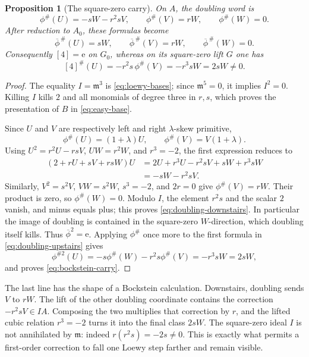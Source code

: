 \documentclass[11pt]{amsart}
\newtheorem{proposition}[theorem]{Proposition}
\theoremstyle{definition}
\theoremstyle{remark}
\newcommand{\m}{\mathfrak m}
\newcommand{\unit}{\mathrm e}
\begin{document}
\begin{proposition}[The square-zero carry]\label{prop:square-zero-carry}
On \(A\), the doubling word is
\begin{equation}\label{eq:doubling-upstairs}
 \phi^\#(U)=-sW-r^2sV,
 \qquad
 \phi^\#(V)=rW,
 \qquad
 \phi^\#(W)=0.
\end{equation}
After reduction to \(A_0\), these formulas become
\begin{equation}\label{eq:doubling-downstairs}
 \overline\phi^{\,\#}(U)=sW,
 \qquad
 \overline\phi^{\,\#}(V)=rW,
 \qquad
 \overline\phi^{\,\#}(W)=0.
\end{equation}
Consequently \([4]=\unit\) on \(G_0\), whereas on its square-zero lift
\(G\) one has
\begin{equation}\label{eq:bockstein-carry}
 [4]^\#(U)
 =-r^2s\,\phi^\#(V)
 =-r^3sW
 =2sW\ne0.
\end{equation}
\end{proposition}

\begin{proof}
The equality \(I=\m^3\) is \eqref{eq:loewy-bases}; since \(\m^5=0\), it
implies \(I^2=0\).  Killing \(I\) kills \(2\) and all monomials of degree
three in \(r,s\), which proves the presentation of \(B\) in
\eqref{eq:easy-base}.

Since \(U\) and \(V\) are respectively left and right
\(\lambda\)-skew primitive,
\[
 \phi^\#(U)=(1+\lambda)U,
 \qquad
 \phi^\#(V)=V(1+\lambda).
\]
Using \(U^2=r^2U-rsV\), \(UW=r^2W\), and \(r^3=-2\), the first expression
reduces to
\begin{align*}
 (2+rU+sV+rsW)U
 &=2U+r^3U-r^2sV+sW+r^3sW\\
 &=-sW-r^2sV.
\end{align*}
Similarly, \(V^2=s^2V\), \(VW=s^2W\), \(s^3=-2\), and \(2r=0\) give
\(\phi^\#(V)=rW\).  Their product is zero, so
\(\phi^\#(W)=0\).  Modulo \(I\), the element \(r^2s\) and the scalar \(2\)
vanish, and minus equals plus; this proves
\eqref{eq:doubling-downstairs}.  In particular the image of doubling is
contained in the square-zero \(W\)-direction, which doubling itself kills.
Thus \(\overline\phi^2=\unit\).  Applying \(\phi^\#\) once more to the
first formula in \eqref{eq:doubling-upstairs} gives
\[
 \phi^{\#2}(U)
 =-s\phi^\#(W)-r^2s\phi^\#(V)
 =-r^3sW=2sW,
\]
and proves \eqref{eq:bockstein-carry}.
\end{proof}

The last line has the shape of a Bockstein calculation.  Downstairs,
doubling sends \(V\) to \(rW\).  The lift of the other doubling coordinate
contains the correction \(-r^2sV\in IA\).  Composing the two multiplies
that correction by \(r\), and the lifted cubic relation
\(r^3=-2\) turns it into the final class \(2sW\).  The square-zero ideal
\(I\) is not annihilated by \(\m\): indeed
\(r(r^2s)=-2s\ne0\).  This is exactly what permits a first-order
correction to fall one Loewy step farther and remain visible.
\end{document}
